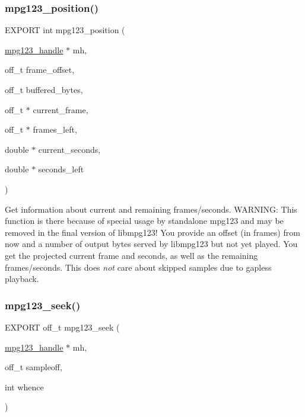 \subsubsection{\texorpdfstring{mpg123\+\_\+position()}{mpg123\_position()}}
{\footnotesize\ttfamily E\+X\+P\+O\+RT int mpg123\+\_\+position (\begin{DoxyParamCaption}\item[{\hyperlink{group__mpg123__init_ga6728e2839a395f3a07d4514da659faca}{mpg123\+\_\+handle} $\ast$}]{mh,  }\item[{off\+\_\+t}]{frame\+\_\+offset,  }\item[{off\+\_\+t}]{buffered\+\_\+bytes,  }\item[{off\+\_\+t $\ast$}]{current\+\_\+frame,  }\item[{off\+\_\+t $\ast$}]{frames\+\_\+left,  }\item[{double $\ast$}]{current\+\_\+seconds,  }\item[{double $\ast$}]{seconds\+\_\+left }\end{DoxyParamCaption})}

Get information about current and remaining frames/seconds. W\+A\+R\+N\+I\+NG\+: This function is there because of special usage by standalone mpg123 and may be removed in the final version of libmpg123! You provide an offset (in frames) from now and a number of output bytes served by libmpg123 but not yet played. You get the projected current frame and seconds, as well as the remaining frames/seconds. This does {\itshape not} care about skipped samples due to gapless playback. \mbox{\label{group__mpg123__seek_ga9a20e3728c86d5a4bfa80facb9b36047}} 
\subsubsection{\texorpdfstring{mpg123\+\_\+seek()}{mpg123\_seek()}}
{\footnotesize\ttfamily E\+X\+P\+O\+RT off\+\_\+t mpg123\+\_\+seek (\begin{DoxyParamCaption}\item[{\hyperlink{group__mpg123__init_ga6728e2839a395f3a07d4514da659faca}{mpg123\+\_\+handle} $\ast$}]{mh,  }\item[{off\+\_\+t}]{sampleoff,  }\item[{int}]{whence }\end{DoxyParamCaption})}

